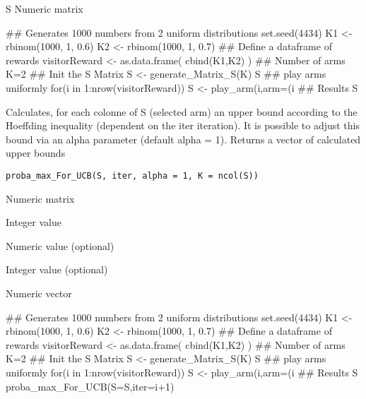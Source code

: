 \documentclass[letterpaper]{book}
\begin{document}
%
\begin{Value}
S Numeric matrix
\end{Value}
%
\begin{Examples}
\begin{ExampleCode}
## Generates 1000 numbers from 2 uniform distributions
set.seed(4434)
K1 <- rbinom(1000, 1, 0.6)
K2 <- rbinom(1000, 1, 0.7)
## Define a dataframe of rewards
visitorReward <- as.data.frame( cbind(K1,K2) )
## Number of arms
K=2
## Init the S Matrix
S <- generate_Matrix_S(K)
S
## play arms uniformly
for(i in 1:nrow(visitorReward)){
S <- play_arm(i,arm=(i%
}
## Results
S
\end{ExampleCode}
\end{Examples}
%
\begin{Description}\relax
Calculates, for each colonne of S (selected arm) an
upper bound according to the Hoeffding inequality
(dependent on the iter iteration).
It is possible to adjust this bound via an
alpha parameter (default alpha = 1).
Returns a vector of calculated upper bounds
\end{Description}
%
\begin{Usage}
\begin{verbatim}
proba_max_For_UCB(S, iter, alpha = 1, K = ncol(S))
\end{verbatim}
\end{Usage}
%
\begin{Arguments}
\begin{ldescription}
\item[\code{S}] Numeric matrix

\item[\code{iter}] Integer value

\item[\code{alpha}] Numeric value (optional)

\item[\code{K}] Integer value (optional)
\end{ldescription}
\end{Arguments}
%
\begin{Value}
Numeric vector
\end{Value}
%
\begin{Examples}
\begin{ExampleCode}
## Generates 1000 numbers from 2 uniform distributions
set.seed(4434)
K1 <- rbinom(1000, 1, 0.6)
K2 <- rbinom(1000, 1, 0.7)
## Define a dataframe of rewards
visitorReward <- as.data.frame( cbind(K1,K2) )
## Number of arms
K=2
## Init the S Matrix
S <- generate_Matrix_S(K)
S
## play arms uniformly
for(i in 1:nrow(visitorReward)){
S <- play_arm(i,arm=(i%
}
## Results
S
proba_max_For_UCB(S=S,iter=i+1)
\end{ExampleCode}
\end{Examples}
\end{document}
